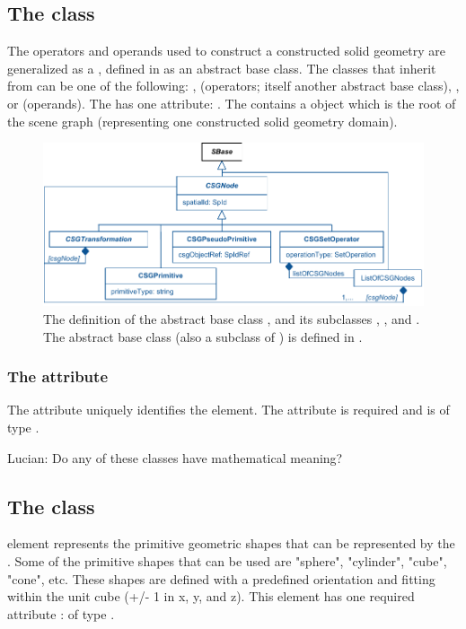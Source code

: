 \subsection{The  class}
\label{CSGNode-class}
The operators and operands used to construct a constructed solid geometry are generalized as a \CSGNode, defined in  as an abstract base class. The classes that inherit from \CSGNode can be one of the following: \CSGSetOperator, \CSGTransformation (operators; itself another abstract base class), \CSGPrimitive, or \CSGPseudoPrimitive (operands). The \CSGNode has one attribute: . The \CSGObject contains a \CSGNode object which is the root of the \CSGObject scene graph (representing one constructed solid geometry domain).

\begin{figure}[ht]
  \includegraphics{figs/CSGNode-uml}
  \caption{The definition of the abstract base class \CSGNode, and its subclasses \CSGPrimitive, \CSGPseudoPrimitive, and \CSGSetOperator.  The abstract base class \CSGTransformation (also a subclass of \CSGNode) is defined in .}
  \label{CSGNode-uml}
  \label{CSGPrimitive-uml}
  \label{CSGPseudoPrimitive-uml}
  \label{CSGSetOperator-uml}
  \label{ListOfCSGNodes-uml}
\end{figure}

\subsubsection{The  attribute}
The  attribute uniquely identifies the \CSGNode element. The attribute is required and is of type .

{\color{red} Lucian: \notice Do any of these classes have mathematical meaning?}


\subsection{The  class}
\label{CSGPrimitive-class}
\CSGPrimitive element represents the primitive geometric shapes that can be represented by the \CSGeometry. Some of the primitive shapes that can be used are "sphere", "cylinder", "cube", "cone", etc. These shapes are defined with a predefined orientation and fitting within the unit cube (+/- 1 in x, y, and z). This element has one required attribute :  of type .

